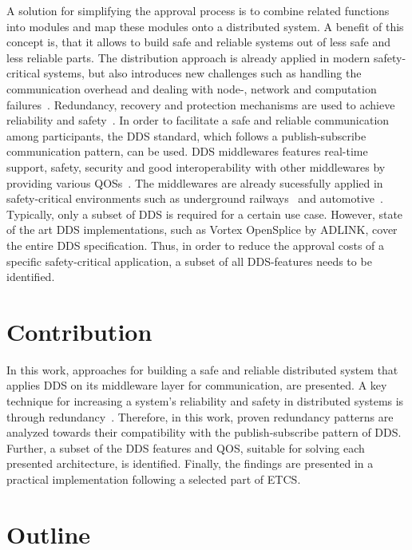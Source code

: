 A solution for simplifying the approval process is to combine related functions into modules and map these modules onto a distributed system.
A benefit of this concept is, that it allows to build safe and reliable systems out of less safe and less reliable parts.
The distribution approach is already applied in modern safety-critical systems, but also introduces new challenges such as handling the communication overhead and dealing with node-, network and computation failures~\cite{DistributedSafety2020}.
Redundancy, recovery and protection mechanisms are used to achieve reliability and safety~\cite{ChakrabortyFaultTolerantRailway}. 
In order to facilitate a safe and reliable communication among participants, the \gls*{DDS} standard, which follows a publish-subscribe communication pattern, can be used.
\Gls*{DDS} middlewares features real-time support, safety, security and good interoperability with other middlewares by providing various \glspl*{QOS}~\cite{DistributedSafety2020}.
The middlewares are already sucessfully applied in safety-critical environments such as underground railways~\cite{DDSInSubways} and automotive~\cite{DistributedSafety2020}.
Typically, only a subset of \gls*{DDS} is required for a certain use case.
However, state of the art \gls*{DDS} implementations, such as Vortex OpenSplice by ADLINK, cover the entire \gls*{DDS} specification.
Thus, in order to reduce the approval costs of a specific safety-critical application, a subset of all \gls*{DDS}-features needs to be identified.


\section{Contribution}


In this work, approaches for building a safe and reliable distributed system that applies \gls*{DDS} on its middleware layer for communication, are presented.
A key technique for increasing a system's reliability and safety in distributed systems is through redundancy~\cite{BarryFaultToleranceAnalysis}.
Therefore, in this work, proven redundancy patterns are analyzed towards their compatibility with the publish-subscribe pattern of \gls*{DDS}.
Further, a subset of the \gls*{DDS} features and \gls*{QOS}, suitable for solving each presented architecture, is identified.
Finally, the findings are presented in a practical implementation following a selected part of \gls*{ETCS}.

\section{Outline}


